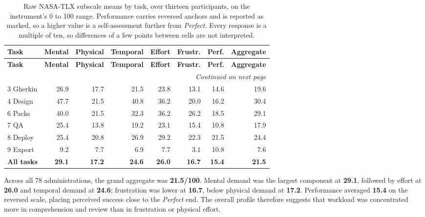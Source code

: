 {\small
\renewcommand{\arraystretch}{1.2}
\setlength{\tabcolsep}{5pt}
\begin{longtable}{l r r r r r r r}
\caption[Raw \acs{NASA-TLX} subscale means by task]{Raw \acs{NASA-TLX} subscale means by task, over thirteen participants, on the instrument's 0 to 100 range. Performance carries reversed anchors and is reported as marked, so a higher value is a self-assessment further from \emph{Perfect}. Every response is a multiple of ten, so differences of a few points between cells are not interpreted.}
\label{tab:tlx_matrix} \\
\toprule
\textbf{Task} & \textbf{Mental} & \textbf{Physical} & \textbf{Temporal} & \textbf{Effort} & \textbf{Frustr.} & \textbf{Perf.} & \textbf{Aggregate} \\
\midrule
\endfirsthead
\toprule
\textbf{Task} & \textbf{Mental} & \textbf{Physical} & \textbf{Temporal} & \textbf{Effort} & \textbf{Frustr.} & \textbf{Perf.} & \textbf{Aggregate} \\
\midrule
\endhead
\midrule
\multicolumn{8}{r}{\textit{Continued on next page}}\\
\bottomrule
\endfoot
\bottomrule
\endlastfoot

3 Gherkin & 26.9 & 17.7 & 21.5 & 23.8 & 13.1 & 14.6 & 19.6 \\
4 Design & 47.7 & 21.5 & 40.8 & 36.2 & 20.0 & 16.2 & 30.4 \\
6 Packs & 40.0 & 21.5 & 32.3 & 36.2 & 26.2 & 18.5 & 29.1 \\
7 \ac{QA} & 25.4 & 13.8 & 19.2 & 23.1 & 15.4 & 10.8 & 17.9 \\
8 Deploy & 25.4 & 20.8 & 26.9 & 29.2 & 22.3 & 21.5 & 24.4 \\
9 Export & 9.2 & 7.7 & 6.9 & 7.7 & 3.1 & 10.8 & 7.6 \\ \addlinespace
\midrule
\textbf{All tasks} & \textbf{29.1} & \textbf{17.2} & \textbf{24.6} & \textbf{26.0} & \textbf{16.7} & \textbf{15.4} & \textbf{21.5} \\
\end{longtable}
}

Across all 78 administrations, the grand aggregate was \textbf{21.5/100}. Mental demand was the largest component at \textbf{29.1}, followed by effort at \textbf{26.0} and temporal demand at \textbf{24.6}; frustration was lower at \textbf{16.7}, below physical demand at \textbf{17.2}. Performance averaged \textbf{15.4} on the reversed scale, placing perceived success close to the \emph{Perfect} end. The overall profile therefore suggests that workload was concentrated more in comprehension and review than in frustration or physical effort.


